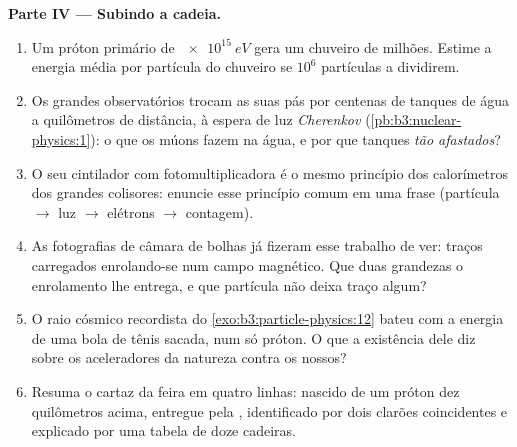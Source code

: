 \begin{problem}
\medskip\noindent\textbf{Parte IV --- Subindo a cadeia.}

\begin{enumerate}[resume]
  \item Um próton primário de $\qty{e15}{eV}$ gera um chuveiro de
        milhões. Estime a energia média por partícula do chuveiro
        se $10^{6}$ partículas a dividirem.
  \item Os grandes observatórios trocam as suas pás por centenas de
        tanques de água a quilômetros de distância, à espera de
        luz \emph{Cherenkov} (\cref{pb:b3:nuclear-physics:1}):
        o que os múons fazem na água, e por que tanques \emph{tão
        afastados}?
  \item O seu cintilador com fotomultiplicadora é o mesmo
        princípio dos calorímetros dos grandes colisores:
        enuncie esse princípio comum em uma frase
        (partícula $\to$ luz $\to$ elétrons $\to$ contagem).
  \item As fotografias de câmara de bolhas já fizeram esse trabalho de ver:
        traços carregados enrolando-se num campo magnético. Que duas
        grandezas o enrolamento lhe entrega, e que partícula não deixa
        traço algum?
  \item O raio cósmico recordista do
        \cref{exo:b3:particle-physics:12} bateu com a energia de
        uma bola de tênis sacada, num só próton. O que a
        existência dele diz sobre os aceleradores da natureza contra os nossos?
  \item Resuma o cartaz da feira em quatro linhas: nascido de um
        próton dez quilômetros acima, entregue pela ,
        identificado por dois clarões coincidentes e explicado por uma
        tabela de doze cadeiras.
\end{enumerate}
\end{problem}
